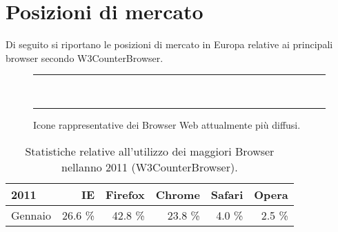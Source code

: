 


\section{Posizioni di mercato} %
\label{sec:posizioni_di_mercato}
Di seguito si riportano le posizioni di mercato in Europa relative ai principali browser secondo W3CounterBrowser.


\begin{figure}[h]               %
	\hrule                          %
	\vspace{1em}
	\begin{center}                  %
		\mbox{
			\epsfxsize=80mm            %
		}                               %
	\end{center}
	\caption{Icone rappresentative dei Browser Web attualmente più diffusi.}   %
	\label{fig:browser:browsers_icon} %
	\vspace{1em}    %
	\hrule          %
	\vspace{-1ex}   %
\end{figure}    %



\begin{table}
\begin{center}
\begin{tabular}{||p{4cm}|*{5}{r|}|}
	\hline
	{\bfseries 2011}  & IE & Firefox & Chrome & Safari & Opera \\
	\hline
	\hline
	Gennaio & 26.6 \% & 42.8 \% & 23.8 \% & 4.0 \% & 2.5 \% \\
	\hline
\end{tabular}
 \caption{Statistiche relative all'utilizzo dei maggiori Browser nellanno 2011 (W3CounterBrowser).}
 \label{tab:brow_stats_2011}
\end{center}
\end{table}


